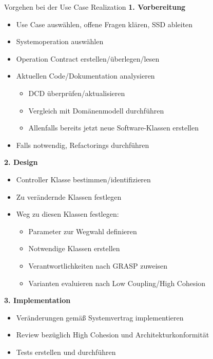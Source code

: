 \begin{KR}{Vorgehen bei der Use Case Realization}
\textbf{1. Vorbereitung}
\begin{itemize}
    \item Use Case auswählen, offene Fragen klären, SSD ableiten
    \item Systemoperation auswählen
    \item Operation Contract erstellen/überlegen/lesen
    \item Aktuellen Code/Dokumentation analysieren
    \begin{itemize}
        \item DCD überprüfen/aktualisieren
        \item Vergleich mit Domänenmodell durchführen
        \item Allenfalls bereits jetzt neue Software-Klassen erstellen
    \end{itemize}
    \item Falls notwendig, Refactorings durchführen
\end{itemize}

\textbf{2. Design}
\begin{itemize}
    \item Controller Klasse bestimmen/identifizieren
    \item Zu verändernde Klassen festlegen
    \item Weg zu diesen Klassen festlegen:
    \begin{itemize}
        \item Parameter zur Wegwahl definieren
        \item Notwendige Klassen erstellen
        \item Verantwortlichkeiten nach GRASP zuweisen
        \item Varianten evaluieren nach Low Coupling/High Cohesion
    \end{itemize}
\end{itemize}

\textbf{3. Implementation}
\begin{itemize}
    \item Veränderungen gemäß Systemvertrag implementieren
    \item Review bezüglich High Cohesion und Architekturkonformität
    \item Tests erstellen und durchführen
\end{itemize}
\end{KR}

